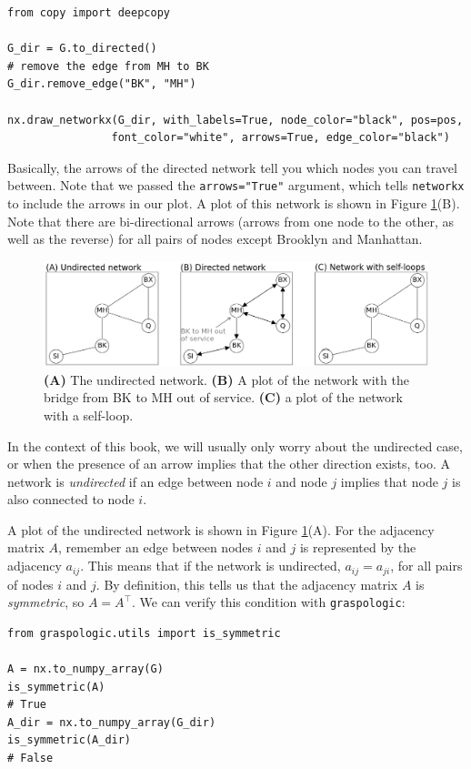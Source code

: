 \begin{lstlisting}[style=python]
from copy import deepcopy

G_dir = G.to_directed()
# remove the edge from MH to BK
G_dir.remove_edge("BK", "MH")

nx.draw_networkx(G_dir, with_labels=True, node_color="black", pos=pos,
                font_color="white", arrows=True, edge_color="black")
\end{lstlisting}

Basically, the arrows of the directed network tell you which nodes you can travel between. Note that we passed the \texttt{arrows="True"} argument, which tells \texttt{networkx} to include the arrows in our plot. A plot of this network is shown in Figure \ref{fig:ch4:directed}(B). Note that there are bi-directional arrows (arrows from one node to the other, as well as the reverse) for all pairs of nodes except Brooklyn and Manhattan.

\begin{figure}[h]
    \centering
    \includegraphics[width=\linewidth]{representations/ch4/Images/directed.png}
    \caption[Comparing directed and undirected networks]{\textbf{(A)} The undirected network. \textbf{(B)} A plot of the network with the bridge from BK to MH out of service. \textbf{(C)} a plot of the network with a self-loop.}
    \label{fig:ch4:directed}
\end{figure}

In the context of this book, we will usually only worry about the undirected case, or when the presence of an arrow implies that the other direction exists, too. A network is \textit{undirected} if an edge between node $i$ and node $j$ implies that node $j$ is also connected to node $i$. 

A plot of the undirected network is shown in Figure \ref{fig:ch4:directed}(A). For the adjacency matrix $A$, remember an edge between nodes $i$ and $j$ is represented by the adjacency $a_{ij}$. This means that if the network is undirected, $a_{ij} = a_{ji}$, for all pairs of nodes $i$ and $j$. By definition, this tells us that the adjacency matrix $A$ is \textit{symmetric}, so $A = A^\top$. We can verify this condition with \texttt{graspologic}:
\begin{lstlisting}[style=python]
from graspologic.utils import is_symmetric

A = nx.to_numpy_array(G)
is_symmetric(A)
# True
A_dir = nx.to_numpy_array(G_dir)
is_symmetric(A_dir)
# False
\end{lstlisting}

